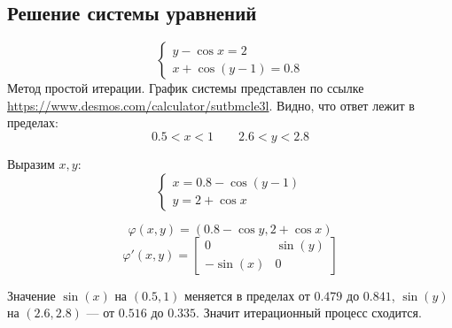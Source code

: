 \subsection{Решение системы уравнений}
\[
	\begin{cases}
		y - \cos x = 2 \\
		x + \cos(y-1) = 0.8
	\end{cases}
\]
Метод простой итерации.
График системы представлен по ссылке \url{https://www.desmos.com/calculator/sutbmcle3l}.
Видно, что ответ лежит в пределах:
\[
	0.5 < x < 1 \qquad 2.6 < y < 2.8
\]

Выразим \(x, y\):
\[
	\begin{cases}
		x = 0.8 - \cos (y-1) \\
		y = 2 + \cos x
	\end{cases}
\]

\[
	\varphi(x, y) = ( 0.8 - \cos y, 2 + \cos x )
\]
\[
	\varphi'(x,y) = \begin{bmatrix}
		0         & \sin(y) \\
		- \sin(x) & 0
	\end{bmatrix}
\]

Значение \(\sin(x)\) на \((0.5, 1)\) меняется в пределах от \(0.479\) до $0.841$,
\(\sin(y)\) на $(2.6, 2.8)$ --- от $0.516$ до $0.335$.
Значит итерационный процесс сходится.

